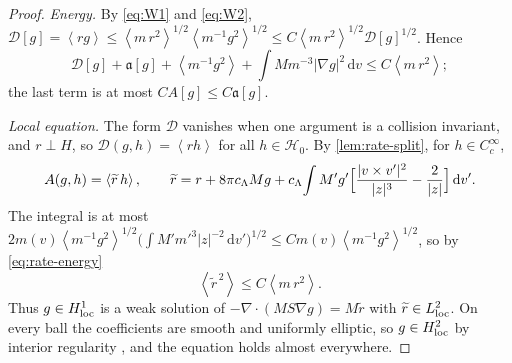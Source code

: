 \documentclass[11pt]{article}
\newcommand{\dd}{\,\mathrm d}
\newcommand{\av}[1]{\left\langle #1\right\rangle}
\newcommand{\D}{\mathcal D}
\newcommand{\HH}{\mathcal H}
\theoremstyle{definition}
\theoremstyle{remark}
\numberwithin{equation}{section}
\begin{document}
\begin{proof}
\emph{Energy.} By \eqref{eq:W1} and \eqref{eq:W2},
$\D[g]=\av{rg}\leq\av{m\,r^2}^{1/2}\av{m^{-1}g^2}^{1/2}
\leq C\av{m\,r^2}^{1/2}\D[g]^{1/2}$. Hence
\begin{equation}
 \D[g]+\mathfrak a[g]+\av{m^{-1}g^2}
   +\int Mm^{-3}|\nabla g|^2\dd v\leq C\av{m\,r^2};
 \label{eq:rate-energy}
\end{equation}
the last term is at most $CA[g]\leq C\mathfrak a[g]$.

\emph{Local equation.} The form $\D$ vanishes when one argument is a
collision invariant, and $r\perp H$, so $\D(g,h)=\av{rh}$ for all
$h\in\HH_0$. By \cref{lem:rate-split}, for $h\in C_c^\infty$,
\[
 A(g,h)=\av{\widetilde r\,h},\qquad
 \widetilde r=r+8\pi c_\Lambda Mg+c_\Lambda\!\int M'g'
   \Bigl[\frac{|v\times v'|^2}{|z|^3}-\frac2{|z|}\Bigr]\dd v' .
\]
The integral is at most
$2m(v)\av{m^{-1}g^2}^{1/2}\bigl(\int M'm'^3|z|^{-2}\dd v'\bigr)^{1/2}
\leq Cm(v)\av{m^{-1}g^2}^{1/2}$, so by \eqref{eq:rate-energy}
\begin{equation}
 \av{\widetilde r^{\,2}}\leq C\av{m\,r^2}.
 \label{eq:rate-rt}
\end{equation}
Thus $g\in H^1_{\rm loc}$ is a weak solution of
$-\nabla\!\cdot(MS\nabla g)=M\widetilde r$ with
$\widetilde r\in L^2_{\rm loc}$. On every ball the coefficients are smooth
and uniformly elliptic, so $g\in H^2_{\rm loc}$ by interior regularity
\cite[Theorem~8.8]{GilbargTrudinger}, and the equation holds almost
everywhere.


\end{proof}
\end{document}
